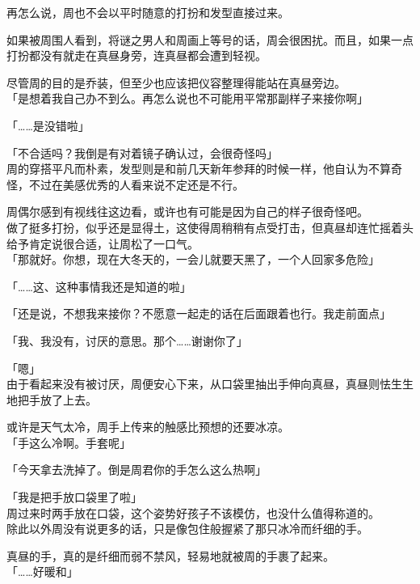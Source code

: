 再怎么说，周也不会以平时随意的打扮和发型直接过来。

如果被周围人看到，将谜之男人和周画上等号的话，周会很困扰。而且，如果一点打扮都没有就走在真昼身旁，连真昼都会遭到轻视。

尽管周的目的是乔装，但至少也应该把仪容整理得能站在真昼旁边。\\

「是想着我自己办不到么。再怎么说也不可能用平常那副样子来接你啊」

「……是没错啦」

「不合适吗？我倒是有对着镜子确认过，会很奇怪吗」\\

周的穿搭平凡而朴素，发型则是和前几天新年参拜的时候一样，他自认为不算奇怪，不过在美感优秀的人看来说不定还是不行。

周偶尔感到有视线往这边看，或许也有可能是因为自己的样子很奇怪吧。\\

做了挺多打扮，似乎还是显得土，这使得周稍稍有点受打击，但真昼却连忙摇着头给予肯定说很合适，让周松了一口气。\\

「那就好。你想，现在大冬天的，一会儿就要天黑了，一个人回家多危险」

「……这、这种事情我还是知道的啦」

「还是说，不想我来接你？不愿意一起走的话在后面跟着也行。我走前面点」

「我、我没有，讨厌的意思。那个……谢谢你了」

「嗯」\\

由于看起来没有被讨厌，周便安心下来，从口袋里抽出手伸向真昼，真昼则怯生生地把手放了上去。

或许是天气太冷，周手上传来的触感比预想的还要冰凉。\\

「手这么冷啊。手套呢」

「今天拿去洗掉了。倒是周君你的手怎么这么热啊」

「我是把手放口袋里了啦」\\

周过来时两手放在口袋，这个姿势好孩子不该模仿，也没什么值得称道的。\\

除此以外周没有说更多的话，只是像包住般握紧了那只冰冷而纤细的手。

真昼的手，真的是纤细而弱不禁风，轻易地就被周的手裹了起来。\\

「……好暖和」\\

